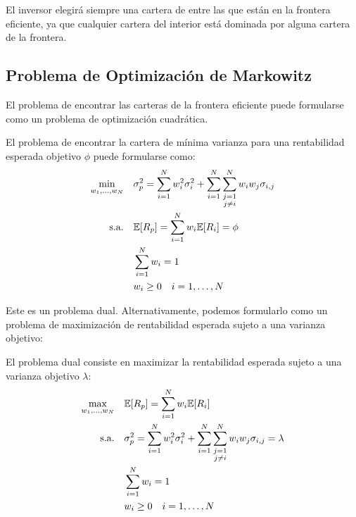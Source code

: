 El inversor elegirá siempre una cartera de entre las que están en la frontera eficiente, ya que cualquier cartera del interior está dominada por alguna cartera de la frontera.

\subsection{Problema de Optimización de Markowitz}

El problema de encontrar las carteras de la frontera eficiente puede formularse como un problema de optimización cuadrática.

\begin{teorema}
El problema de encontrar la cartera de mínima varianza para una rentabilidad esperada objetivo $\phi$ puede formularse como:
\begin{align}
\min_{w_1, \ldots, w_N} \quad & \sigma_p^2 = \sum_{i=1}^N w_i^2 \sigma_i^2 + \sum_{i=1}^N \sum_{\substack{j=1 \\ j \neq i}}^N w_i w_j \sigma_{i,j} \label{eq:min_var}\\
\text{s.a.} \quad & \mathbb{E}[R_p] = \sum_{i=1}^N w_i \mathbb{E}[R_i] = \phi \label{eq:const_ret}\\
& \sum_{i=1}^N w_i = 1 \label{eq:const_sum}\\
& w_i \geq 0 \quad i = 1, \ldots, N \label{eq:const_short}
\end{align}
\end{teorema}

Este es un problema dual. Alternativamente, podemos formularlo como un problema de maximización de rentabilidad esperada sujeto a una varianza objetivo:

\begin{teorema}
El problema dual consiste en maximizar la rentabilidad esperada sujeto a una varianza objetivo $\lambda$:
\begin{align}
\max_{w_1, \ldots, w_N} \quad & \mathbb{E}[R_p] = \sum_{i=1}^N w_i \mathbb{E}[R_i] \label{eq:max_ret}\\
\text{s.a.} \quad & \sigma_p^2 = \sum_{i=1}^N w_i^2 \sigma_i^2 + \sum_{i=1}^N \sum_{\substack{j=1 \\ j \neq i}}^N w_i w_j \sigma_{i,j} = \lambda \label{eq:const_var}\\
& \sum_{i=1}^N w_i = 1 \label{eq:const_sum2}\\
& w_i \geq 0 \quad i = 1, \ldots, N \label{eq:const_short2}
\end{align}
\end{teorema}

